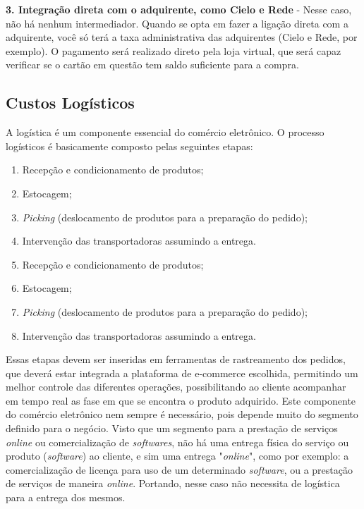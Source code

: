 \textbf{3. Integração direta com o adquirente, como Cielo e Rede} - Nesse caso, não há nenhum intermediador. Quando se opta em fazer a ligação direta com a adquirente, você só terá a taxa administrativa das adquirentes (Cielo e Rede, por exemplo). O pagamento será realizado direto pela loja virtual, que será capaz verificar se o cartão em questão tem saldo suficiente para a compra.

\subsection{Custos Logísticos}

A logística é um componente essencial do comércio eletrônico. O processo logísticos é basicamente composto pelas seguintes etapas:

\begin{enumerate}
	\item Recepção e condicionamento de produtos;
	\item Estocagem;
	\item \textit{Picking} (deslocamento de  produtos para a preparação do pedido);
	\item Intervenção das transportadoras assumindo a entrega.
	\item Recepção e condicionamento de produtos;
	\item Estocagem;
	\item \textit{Picking} (deslocamento de  produtos para a preparação do pedido);
	\item Intervenção das transportadoras assumindo a entrega.
\end{enumerate}

Essas etapas devem ser inseridas em ferramentas de rastreamento dos pedidos, que deverá estar integrada a plataforma de e-commerce escolhida, permitindo um melhor controle das diferentes operações, possibilitando ao cliente acompanhar em tempo real as fase em que se encontra o produto adquirido. Este componente do comércio eletrônico nem sempre é necessário, pois depende muito do segmento definido para o negócio. Visto que um segmento para a prestação de serviços \textit{online} ou comercialização de \textit{softwares}, não há uma entrega física do serviço ou produto (\textit{software}) ao cliente, e sim uma entrega "\textit{online}", como por exemplo: a comercialização de licença para uso de um determinado \textit{software}, ou a prestação de serviços de maneira \textit{online}. Portando, nesse caso não necessita de logística para a entrega dos mesmos. 

